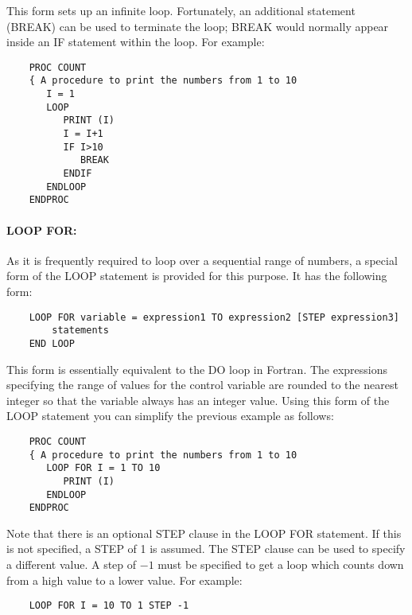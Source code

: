 This form sets up an infinite loop.
Fortunately, an additional statement (BREAK) can be used to terminate the loop;
BREAK would normally appear inside an IF statement within the loop.
For example:

\begin{small}
\begin{verbatim}
    PROC COUNT
    { A procedure to print the numbers from 1 to 10
       I = 1
       LOOP
          PRINT (I)
          I = I+1
          IF I>10
             BREAK
          ENDIF
       ENDLOOP
    ENDPROC
\end{verbatim}
\end{small}

\paragraph{LOOP FOR:}\hfill

As it is frequently required to loop over a sequential range of numbers, a
special form of the LOOP statement is provided for this purpose.
It has the following form:

\begin{small}
\begin{verbatim}
    LOOP FOR variable = expression1 TO expression2 [STEP expression3]
        statements
    END LOOP
\end{verbatim}
\end{small}

This form is essentially equivalent to the DO loop in Fortran.
The expressions specifying the range of values for the control variable are
rounded to the nearest integer so that the variable always has an integer value.
Using this form of the LOOP statement you can simplify the previous example as 
follows:

\begin{small}
\begin{verbatim}
    PROC COUNT
    { A procedure to print the numbers from 1 to 10
       LOOP FOR I = 1 TO 10
          PRINT (I)
       ENDLOOP
    ENDPROC
\end{verbatim}
\end{small}

Note that there is an optional STEP clause in the LOOP FOR statement.
If this is not specified, a STEP of 1 is assumed.
The STEP clause can be used to specify a different value.
A step of $-1$ must be specified to get a loop which counts down from a high
value to a lower value.
For example:

\begin{small}
\begin{verbatim}
    LOOP FOR I = 10 TO 1 STEP -1
\end{verbatim}
\end{small}

